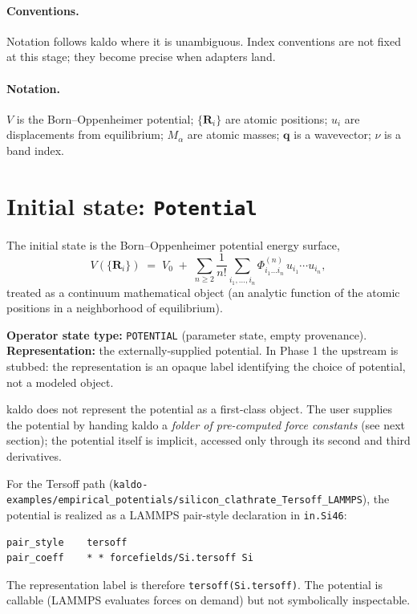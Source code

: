 \documentclass[11pt,a4paper]{article}
\begin{document}
\paragraph{Conventions.} Notation follows kaldo where it is unambiguous. Index conventions are
not fixed at this stage; they become precise when adapters land.

\paragraph{Notation.} $V$ is the Born--Oppenheimer potential; $\{\mathbf{R}_i\}$ are atomic
positions; $u_i$ are displacements from equilibrium; $M_\alpha$ are atomic masses; $\mathbf{q}$
is a wavevector; $\nu$ is a band index.

\section{Initial state: \texttt{Potential}}

\begin{abstractbox}
The initial state is the Born--Oppenheimer potential energy surface,
\begin{equation}
  V(\{\mathbf{R}_i\}) \;=\; V_0 \;+\; \sum_{n \geq 2} \frac{1}{n!} \sum_{i_1,\ldots,i_n}
  \Phi^{(n)}_{i_1\ldots i_n}\, u_{i_1} \cdots u_{i_n},
\end{equation}
treated as a continuum mathematical object (an analytic function of the atomic positions in a
neighborhood of equilibrium).

\medskip
\textbf{Operator state type:} \texttt{POTENTIAL} (parameter state, empty provenance).\\
\textbf{Representation:} the externally-supplied potential. In Phase 1 the upstream is stubbed:
the representation is an opaque label identifying the choice of potential, not a modeled
object.
\end{abstractbox}

\begin{kaldobox}
kaldo does not represent the potential as a first-class object. The user supplies the potential
by handing kaldo a \emph{folder of pre-computed force constants} (see next section); the
potential itself is implicit, accessed only through its second and third derivatives.

\medskip
For the Tersoff path (\texttt{kaldo-examples/empirical\_potentials/silicon\_clathrate\_Tersoff\_LAMMPS}),
the potential is realized as a LAMMPS pair-style declaration in \texttt{in.Si46}:
\begin{verbatim}
pair_style    tersoff
pair_coeff    * * forcefields/Si.tersoff Si
\end{verbatim}
The representation label is therefore \texttt{tersoff(Si.tersoff)}. The potential is callable
(LAMMPS evaluates forces on demand) but not symbolically inspectable.
\end{kaldobox}
\end{document}
